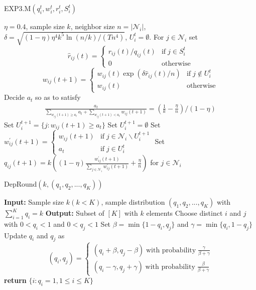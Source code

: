 \documentclass{article}
\begin{document}
\begin{algorithm}[ht]
\caption{EXP3.M$(q_i^t, w_i^t, r_i^t, S_i^t)$}
\label{alg:exp3m}
\begin{algorithmic}[1]
\Require $\eta=0.4$, sample size $k$, neighbor size $n=\left|\mathcal{N}_i\right|$, $\delta=\sqrt{(1-\eta)\eta^4 k^5 \ln(n/k)/(T n^4)}$, $U_i^t=\emptyset$.
	\State For $j\in\mathcal{N}_i$ set
	$$
	\hat{r}_{ij}(t)=
	\begin{cases}
		r_{ij}(t)/q_{ij}(t)& \text{if}\; j\in S_i^t \\
		0& \text{otherwise}
	\end{cases}
	$$
	$$
	w_{ij}(t+1)=
	\begin{cases}
		w_{ij}(t)\exp(\delta\hat{r}_{ij}(t)/n)& \text{if}\; j\notin U_i^t \\
		w_{ij}(t)& \text{otherwise}
	\end{cases}
	$$
		\State Decide $a_t$ so as to satisfy
		\begin{align*}
			\frac{a_t}{\sum_{w_{ij}(t+1)\geq a_t}a_t+\sum_{w_{ij}(t+1)<a_t}w_{ij}(t+1)} 
		    =(\frac{1}{k}-\frac{\eta}{n})/(1-\eta)
		\end{align*}
		\State Set $U_i^{t+1}=\{j:w_{ij}(t+1)\geq a_t\}$
                \Else
		\State Set $U_i^{t+1}=\emptyset$
                \EndIf
	\State Set
		$
		w_{ij}^{\prime}(t+1)=
		\begin{cases}
			w_{ij}(t+1)& \text{if}\; j\in\mathcal{N}_i\backslash U_i^{t+1} \\
			a_t& \text{if}\; j\in U_i^{t}
		\end{cases}
		$
	\State Set
		$
		q_{ij}(t+1)=k\left((1-\eta)\frac{w_{ij}^{\prime}(t+1)}{\sum_{j\in\mathcal{N}_i}w_{ij}^{\prime}(t+1)} + \frac{\eta}{n}\right)
		$ for
		$
j\in\mathcal{N}_i
		$
\end{algorithmic}
\end{algorithm}

\begin{algorithm}
\caption{DepRound$(k,(q_{1},q_{2},...,q_{K}))$}
\label{alg:dep_round}
\begin{algorithmic}[1]
\State \textbf{Input:} Sample size $k(k<K)$, sample distribution $(q_1,q_2,...,q_K)$ with $\sum_{i=1}^{K}q_i=k$
\State \textbf{Output:} Subset of $[K]$ with $k$ elements
    \State Choose distinct $i$ and $j$ with $0<q_i<1$ and $0<q_j<1$
    \State Set $\beta=\min\{1-q_i, q_j\}$ and $\gamma=\min\{q_i,1-q_j\}$ 
    \State Update $q_i$ and $q_j$ as
    $$
    (q_i,q_j)=\begin{cases}
		(q_i+\beta,q_j-\beta)\; \text{with probability}\; \frac{\gamma}{\beta+\gamma} \\
		(q_i-\gamma,q_j+\gamma)\; \text{with probability}\; \frac{\beta}{\beta+\gamma}
	\end{cases}
    $$
\EndWhile
\State \textbf{return} $\{i:q_i=1,1\leq i\leq K\}$
\end{algorithmic}
\end{algorithm}
\end{document}
